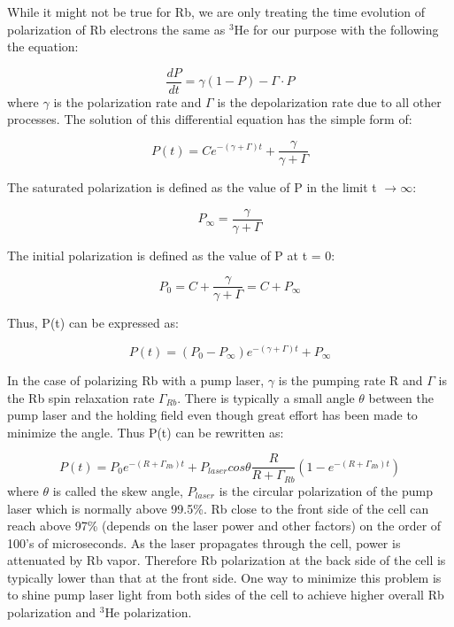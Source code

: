 While it might not be true for Rb, we are only treating the time evolution of polarization of Rb electrons the same as $^{3}$He for our purpose with the following the equation:

\begin{equation}
\frac{dP}{dt}=\gamma(1-P)-\Gamma \cdot P
\end{equation}
where $\gamma$ is the polarization rate and $\Gamma$ is the depolarization rate due to all other processes. The solution of this differential equation has the simple form of:

\begin{equation}
P(t)=Ce^{-(\gamma+\Gamma)t} + \frac{\gamma}{\gamma+\Gamma}
\end{equation}

The saturated polarization is defined as the value of P in the limit t $\rightarrow \infty$:

\begin{equation}
P_{\infty}=\frac{\gamma}{\gamma+\Gamma}
\end{equation}

The initial polarization is defined as the value of P at t = 0:

\begin{equation}
P_{0}=C+\frac{\gamma}{\gamma+\Gamma}=C+P_{\infty}
\end{equation}

Thus, P(t) can be expressed as:

\begin{equation}
P(t)=(P_{0}-P_{\infty})e^{-(\gamma+\Gamma)t}+P_{\infty}
\end{equation}

In the case of polarizing Rb with a pump laser, $\gamma$ is the pumping rate R and $\Gamma$ is the Rb spin relaxation rate $\Gamma_{Rb}$. There is typically a small angle $\theta$ between the pump laser and the holding field even though great effort has been made to minimize the angle. Thus P(t) can be rewritten as:

\begin{equation}\label{Pt}
P(t) = P_{0}e^{-(R+\Gamma_{Rb})t} + P_{laser}cos\theta \frac{R}{R+\Gamma_{Rb}}(1-e^{-(R+\Gamma_{Rb})t})
\end{equation}
where $\theta$ is called the skew angle, $P_{laser}$ is the circular polarization of the pump laser which is normally above 99.5\%. Rb close to the front side of the cell can reach above 97\% (depends on the laser power and other factors) on the order of 100's of microseconds. As the laser propagates through the cell, power is attenuated by Rb vapor. Therefore Rb polarization at the back side of the cell is typically lower than that at the front side. One way to minimize this problem is to shine pump laser light from both sides of the cell to achieve higher overall Rb polarization and $^{3}$He polarization.

